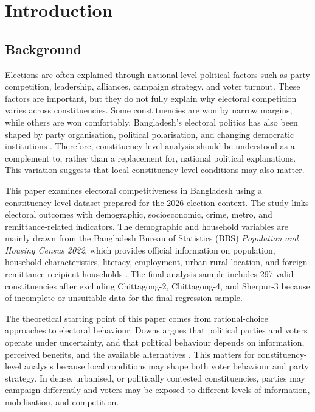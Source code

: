 \documentclass[12pt,a4paper]{article}
\begin{document}
\section{Introduction}

\subsection{Background}

Elections are often explained through national-level political factors such as party competition, leadership, alliances, campaign strategy, and voter turnout. These factors are important, but they do not fully explain why electoral competition varies across constituencies. Some constituencies are won by narrow margins, while others are won comfortably. Bangladesh's electoral politics has also been shaped by party organisation, political polarisation, and changing democratic institutions \citep{jahan2014,riaz2019}. Therefore, constituency-level analysis should be understood as a complement to, rather than a replacement for, national political explanations. This variation suggests that local constituency-level conditions may also matter.

This paper examines electoral competitiveness in Bangladesh using a constituency-level dataset prepared for the 2026 election context. The study links electoral outcomes with demographic, socioeconomic, crime, metro, and remittance-related indicators. The demographic and household variables are mainly drawn from the Bangladesh Bureau of Statistics (BBS) \textit{Population and Housing Census 2022}, which provides official information on population, household characteristics, literacy, employment, urban-rural location, and foreign-remittance-recipient households \citep{bbs2023}. The final analysis sample includes 297 valid constituencies after excluding Chittagong-2, Chittagong-4, and Sherpur-3 because of incomplete or unsuitable data for the final regression sample.

The theoretical starting point of this paper comes from rational-choice approaches to electoral behaviour. Downs argues that political parties and voters operate under uncertainty, and that political behaviour depends on information, perceived benefits, and the available alternatives \citep{downs1957}. This matters for constituency-level analysis because local conditions may shape both voter behaviour and party strategy. In dense, urbanised, or politically contested constituencies, parties may campaign differently and voters may be exposed to different levels of information, mobilisation, and competition.
\end{document}
